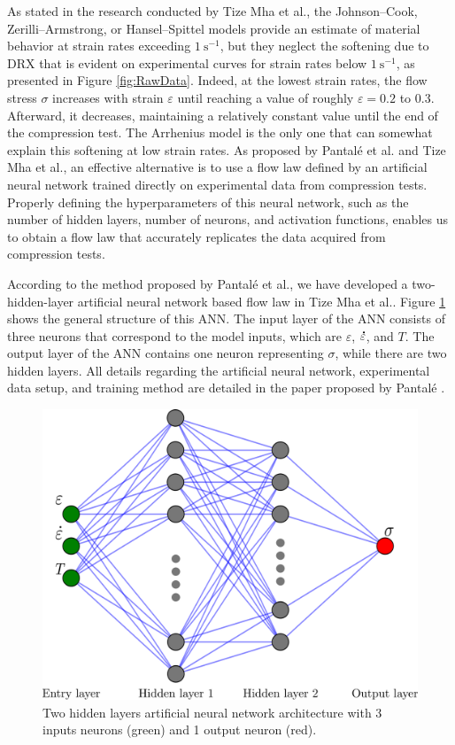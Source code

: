 \documentclass[metals,article,submit,pdftex,moreauthors]{Definitions/mdpi}
\makeatletter
\DeclareRobustCommand{\mdot}[1]{\accentset{\mbox{\bfseries .}}{#1}}
\DeclareRobustCommand{\eal}{et al.\@\xspace}
\DeclareRobustCommand{\ps}{\text{s}^{-1}}
\makeatother
\begin{document}
As stated in the research conducted by Tize Mha \eal \cite{TizeMha-2023}, the Johnson--Cook, Zerilli--Armstrong, or Hansel--Spittel models provide an estimate of material behavior at strain rates exceeding $1~\ps$, but they neglect the softening due to DRX that is evident on experimental curves for strain rates below $1~\ps$, as presented in Figure \ref{fig:RawData}.
Indeed, at the lowest strain rates, the flow stress $\sigma$ increases with strain $\varepsilon$ until reaching a value of roughly $\varepsilon=0.2$ to $0.3$. 
Afterward, it decreases, maintaining a relatively constant value until the end of the compression test.
The Arrhenius model is the only one that can somewhat explain this softening at low strain rates.
As proposed by Pantalé \eal \cite{Pantale-2021, Pantale-2023} and Tize Mha \eal \cite{TizeMha-2023}, an effective alternative is to use a flow law defined by an artificial neural network trained directly on experimental data from compression tests.
Properly defining the hyperparameters of this neural network, such as the number of hidden layers, number of neurons, and activation functions, enables us to obtain a flow law that accurately replicates the data acquired from compression tests.

According to the method proposed by Pantalé \eal \cite{Pantale-2021, Pantale-2023}, we have developed a two-hidden-layer artificial neural network based flow law in Tize Mha \eal \cite{TizeMha-2023}. 
Figure \ref{fig:ANN-2HL} shows the general structure of this ANN. 
The input layer of the ANN consists of three neurons that correspond to the model inputs, which are $\varepsilon$, $\mdot\varepsilon$, and $T$. 
The output layer of the ANN contains one neuron representing $\sigma$, while there are two hidden layers.
All details regarding the artificial neural network, experimental data setup, and training method are detailed in the paper proposed by Pantalé \cite{Pantale-2023}.

\begin{figure}[H]
\centering
\includegraphics[width=0.55\columnwidth]{Figures/ANN-scheme-2HL}
\caption{Two hidden layers artificial neural network architecture with 3 inputs neurons (green) and 1 output neuron (red).}
\label{fig:ANN-2HL}
\end{figure}
\end{document}

